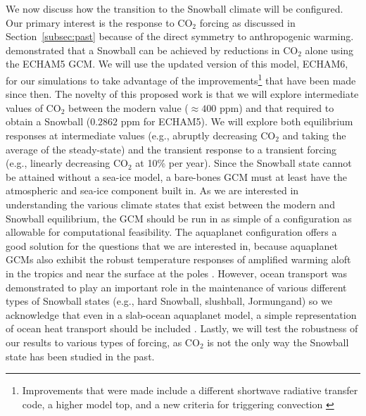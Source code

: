 \documentclass{article}
\begin{document}
We now discuss how the transition to the Snowball climate will be configured. Our primary interest is the response to CO$_2$ forcing as discussed in Section~\ref{subsec:past} because of the direct symmetry to anthropogenic warming. \citet{voigt-marotzke-2010} demonstrated that a Snowball can be achieved by reductions in CO$_2$ alone using the ECHAM5 GCM. We will use the updated version of this model, ECHAM6, for our simulations to take advantage of the improvements\footnote{Improvements that were made include a different shortwave radiative transfer code, a higher model top, and a new criteria for triggering convection \citep{stevens-et-al-2013}} that have been made since then. The novelty of this proposed work is that we will explore intermediate values of CO$_2$ between the modern value ($\approx 400$ ppm) and that required to obtain a Snowball ($0.2862$ ppm for ECHAM5). We will explore both equilibrium responses at intermediate values (e.g., abruptly decreasing CO$_2$ and taking the average of the steady-state) and the transient response to a transient forcing (e.g., linearly decreasing CO$_2$ at 10\% per year). Since the Snowball state cannot be attained without a sea-ice model, a bare-bones GCM must at least have the atmospheric and sea-ice component built in. As we are interested in understanding the various climate states that exist between the modern and Snowball equilibrium, the GCM should be run in as simple of a configuration as allowable for computational feasibility. The aquaplanet configuration offers a good solution for the questions that we are interested in, because aquaplanet GCMs also exhibit the robust temperature responses of amplified warming aloft in the tropics and near the surface at the poles \citep{shaw-tan-2018}. However, ocean transport was demonstrated to play an important role in the maintenance of various different types of Snowball states (e.g., hard Snowball, slushball, Jormungand) so we acknowledge that even in a slab-ocean aquaplanet model, a simple representation of ocean heat transport should be included \citep{rose-2015}. Lastly, we will test the robustness of our results to various types of forcing, as CO$_2$ is not the only way the Snowball state has been studied in the past.
\end{document}
